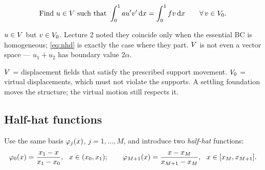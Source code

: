\begin{equation}\label{eq:nhdvar}
  \text{Find } u\in V \text{ such that }
  \int_{0}^{1} a u'v'\,\mathrm{d} x = \int_{0}^{1} f v\,\mathrm{d} x
  \qquad \forall\, v\in V_{0}.
\end{equation}


\begin{pitfall}
$u\in V$ but $v\in V_{0}$. Lecture 2 noted they coincide only when the
essential BC is homogeneous; \eqref{eq:nhd} is exactly the case where they part.
$V$ is not even a vector space --- $u_1+u_2$ has boundary value $2\alpha$.
\end{pitfall}

\begin{mechanics}
$V$ = displacement fields that satisfy the prescribed support movement.
$V_{0}$ = virtual displacements, which must not violate the supports.
A settling foundation moves the structure; the virtual motion still respects it.
\end{mechanics}

\subsection*{Half-hat functions}

\begin{center}
\end{center}

Use the same basis $\varphi_{j}(x)$, $j=1,\dots,M$, and introduce two
\emph{half-hat} functions:
\begin{equation}\label{eq:halfhat}
  \phih_{0}(x)=\frac{x_{1}-x}{x_{1}-x_{0}},\ \ x\in(x_{0},x_{1});
  \qquad
  \phih_{M+1}(x)=\frac{x-x_{M}}{x_{M+1}-x_{M}},\ \ x\in[x_{M},x_{M+1}].
\end{equation}

